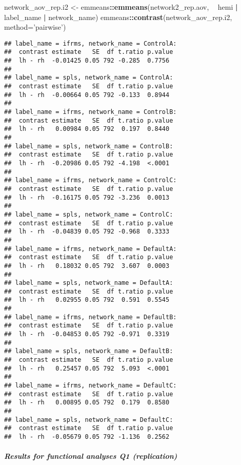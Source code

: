 \documentclass[
]{article}
\newenvironment{Shaded}{\begin{snugshade}}{\end{snugshade}}
\newcommand{\DataTypeTok}[1]{\textcolor[rgb]{0.13,0.29,0.53}{#1}}
\newcommand{\KeywordTok}[1]{\textcolor[rgb]{0.13,0.29,0.53}{\textbf{#1}}}
\newcommand{\NormalTok}[1]{#1}
\newcommand{\OperatorTok}[1]{\textcolor[rgb]{0.81,0.36,0.00}{\textbf{#1}}}
\newcommand{\StringTok}[1]{\textcolor[rgb]{0.31,0.60,0.02}{#1}}
\begin{document}
\begin{Shaded}
\begin{Highlighting}[]
\NormalTok{network_aov_rep.i2 <-}\StringTok{ }\NormalTok{emmeans}\OperatorTok{::}\KeywordTok{emmeans}\NormalTok{(network2_rep.aov, }\OperatorTok{~}\StringTok{ }\NormalTok{hemi }\OperatorTok{|}\StringTok{ }\NormalTok{label_name }\OperatorTok{|}\StringTok{ }\NormalTok{network_name)}
\NormalTok{emmeans}\OperatorTok{::}\KeywordTok{contrast}\NormalTok{(network_aov_rep.i2, }\DataTypeTok{method=}\StringTok{'pairwise'}\NormalTok{)}
\end{Highlighting}
\end{Shaded}

\begin{verbatim}
## label_name = ifrms, network_name = ControlA:
##  contrast estimate   SE  df t.ratio p.value
##  lh - rh  -0.01425 0.05 792 -0.285  0.7756 
## 
## label_name = spls, network_name = ControlA:
##  contrast estimate   SE  df t.ratio p.value
##  lh - rh  -0.00664 0.05 792 -0.133  0.8944 
## 
## label_name = ifrms, network_name = ControlB:
##  contrast estimate   SE  df t.ratio p.value
##  lh - rh   0.00984 0.05 792  0.197  0.8440 
## 
## label_name = spls, network_name = ControlB:
##  contrast estimate   SE  df t.ratio p.value
##  lh - rh  -0.20986 0.05 792 -4.198  <.0001 
## 
## label_name = ifrms, network_name = ControlC:
##  contrast estimate   SE  df t.ratio p.value
##  lh - rh  -0.16175 0.05 792 -3.236  0.0013 
## 
## label_name = spls, network_name = ControlC:
##  contrast estimate   SE  df t.ratio p.value
##  lh - rh  -0.04839 0.05 792 -0.968  0.3333 
## 
## label_name = ifrms, network_name = DefaultA:
##  contrast estimate   SE  df t.ratio p.value
##  lh - rh   0.18032 0.05 792  3.607  0.0003 
## 
## label_name = spls, network_name = DefaultA:
##  contrast estimate   SE  df t.ratio p.value
##  lh - rh   0.02955 0.05 792  0.591  0.5545 
## 
## label_name = ifrms, network_name = DefaultB:
##  contrast estimate   SE  df t.ratio p.value
##  lh - rh  -0.04853 0.05 792 -0.971  0.3319 
## 
## label_name = spls, network_name = DefaultB:
##  contrast estimate   SE  df t.ratio p.value
##  lh - rh   0.25457 0.05 792  5.093  <.0001 
## 
## label_name = ifrms, network_name = DefaultC:
##  contrast estimate   SE  df t.ratio p.value
##  lh - rh   0.00895 0.05 792  0.179  0.8580 
## 
## label_name = spls, network_name = DefaultC:
##  contrast estimate   SE  df t.ratio p.value
##  lh - rh  -0.05679 0.05 792 -1.136  0.2562
\end{verbatim}

\hypertarget{results-for-functional-analyses-q1-replication}{%
\subparagraph{Results for functional analyses Q1
(replication)}\label{results-for-functional-analyses-q1-replication}}
\end{document}
